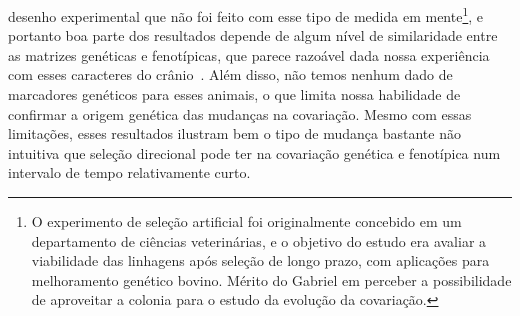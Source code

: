 \begin{refsection}
desenho experimental que não foi feito com esse tipo de medida em
mente\footnote{O experimento de seleção artificial foi originalmente concebido
em um departamento de ciências veterinárias, e o objetivo do estudo era
avaliar a viabilidade das linhagens após seleção de longo prazo, com
aplicações para melhoramento genético bovino. Mérito do Gabriel em perceber a
possibilidade de aproveitar a colonia para o estudo da evolução da
covariação.}, e portanto boa parte dos resultados depende de algum nível de
similaridade entre as matrizes genéticas e fenotípicas, que parece razoável
dada nossa experiência com esses caracteres do
crânio~\parencite{Garcia2014-oj, Cheverud1988-he}. Além disso, não temos
nenhum dado de marcadores genéticos para esses animais, o que limita nossa
habilidade de confirmar a origem genética das mudanças na covariação. Mesmo
com essas limitações, esses resultados ilustram bem o tipo de mudança bastante
não intuitiva que seleção direcional pode ter na covariação genética e
fenotípica num intervalo de tempo relativamente curto.


\end{refsection}
